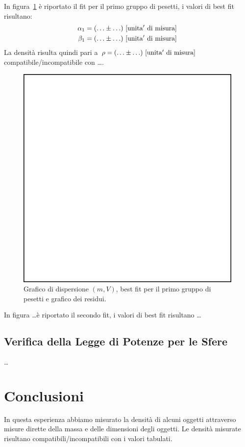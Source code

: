 \documentclass[a4paper]{article}
\begin{document}
In figura~\ref{fig:densita1} \`e riportato il  fit per il primo gruppo di pesetti, i valori di best fit risultano:
\begin{eqnarray}
    \alpha_1 = (\ldots \pm \ldots)\ \rm [unita'\ di\ misura] \\
    \beta_1 = (\ldots \pm \ldots)\ \rm [unita'\ di\ misura]
\end{eqnarray}
La densit\`a risulta quindi pari a $\rho = (\ldots\pm\ldots)\ \rm [unita'\ di\ misura]$ compatibile/incompatibile con \ldots.

\begin{figure}
    \centering
     \includegraphics[width=0.5\linewidth]{blankfig.pdf}
    \caption{Grafico di dispersione $(m,V)$, best fit per il primo gruppo di pesetti e grafico dei residui.}
    \label{fig:densita1}
\end{figure}

In figura \ldots  \`e riportato il secondo fit, i valori di best fit risultano \ldots

\subsection{Verifica della Legge di Potenze per le Sfere}

\ldots

\section{Conclusioni}
In questa esperienza abbiamo misurato la densit\`a di alcuni oggetti attraverso misure dirette della massa e delle dimensioni degli oggetti. Le densit\`a misurate risultano compatibili/incompatibili con i valori tabulati.
\end{document}
